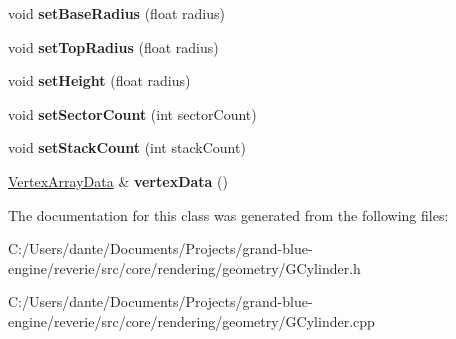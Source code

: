 \begin{DoxyCompactItemize}
void {\bfseries set\+Base\+Radius} (float radius)
\item 
\mbox{\label{classrev_1_1_cylinder_af6b6990667dd9e6651e5fc87f32bbd3f}} 
void {\bfseries set\+Top\+Radius} (float radius)
\item 
\mbox{\label{classrev_1_1_cylinder_a25f23fd28787e4003435b9c0f30497f4}} 
void {\bfseries set\+Height} (float radius)
\item 
\mbox{\label{classrev_1_1_cylinder_ac8ce355b0774906ca0dc21e7fb0d3947}} 
void {\bfseries set\+Sector\+Count} (int sector\+Count)
\item 
\mbox{\label{classrev_1_1_cylinder_a4018399e0fcb8247efe046b71cd7c8bf}} 
void {\bfseries set\+Stack\+Count} (int stack\+Count)
\item 
\mbox{\label{classrev_1_1_cylinder_a3018c4a31aef0dc9ce0f2c12457d1642}} 
\mbox{\hyperlink{classrev_1_1_vertex_array_data}{Vertex\+Array\+Data}} \& {\bfseries vertex\+Data} ()
\end{DoxyCompactItemize}


The documentation for this class was generated from the following files\+:\begin{DoxyCompactItemize}
\item 
C\+:/\+Users/dante/\+Documents/\+Projects/grand-\/blue-\/engine/reverie/src/core/rendering/geometry/G\+Cylinder.\+h\item 
C\+:/\+Users/dante/\+Documents/\+Projects/grand-\/blue-\/engine/reverie/src/core/rendering/geometry/G\+Cylinder.\+cpp\end{DoxyCompactItemize}
